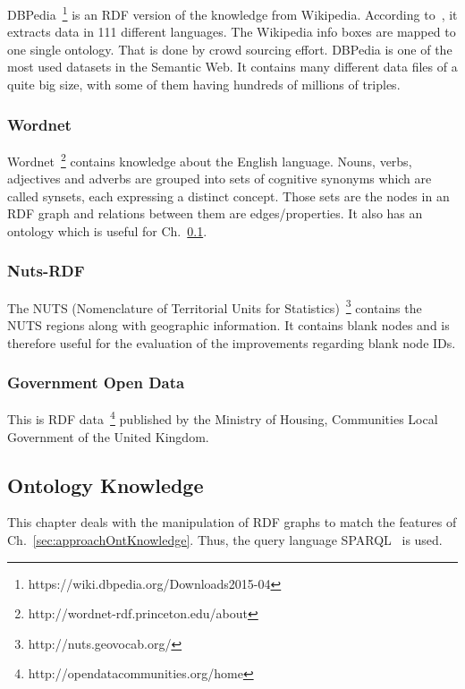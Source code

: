 DBPedia~\footnote{https://wiki.dbpedia.org/Downloads2015-04} is an RDF version of the knowledge from Wikipedia. According to~\cite{dbpedia}, it extracts data in 111 different languages. The Wikipedia info boxes are mapped to one single ontology. That is done by crowd sourcing effort. DBPedia is one of the most used datasets in the Semantic Web.  It contains many different data files of a quite big size, with some of them having hundreds of millions of triples.~\cite{dbpedia}

\subsubsection{Wordnet}

Wordnet~\footnote{http://wordnet-rdf.princeton.edu/about} contains knowledge about the English language. Nouns, verbs, adjectives and adverbs are grouped into sets of cognitive synonyms which are called synsets, each expressing a distinct concept. Those sets are the nodes in an RDF graph and relations between them are edges/properties. It also has an ontology which is useful for Ch.~\ref{sec:implementationOntKnowledge}.~\cite{wordnet}

\subsubsection{Nuts-RDF}

The NUTS (Nomenclature of Territorial Units for Statistics)~\footnote{http://nuts.geovocab.org/} contains the NUTS regions along with geographic information. It contains blank nodes and is therefore useful for the evaluation of the improvements regarding blank node IDs.

\subsubsection{Government Open Data}

This is RDF data~\footnote{http://opendatacommunities.org/home} published by the Ministry of Housing, Communities Local Government of the United Kingdom.

\subsection{Ontology Knowledge}\label{sec:implementationOntKnowledge}

This chapter deals with the manipulation of RDF graphs to match the features of Ch.~\ref{sec:approachOntKnowledge}. Thus, the query language SPARQL~\cite{sparql} is used.


